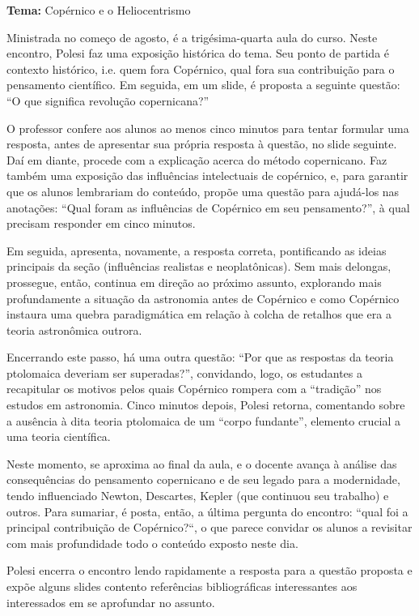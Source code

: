 \documentclass[12pt,a4paper]{article}
\begin{document}
	\textbf{Tema:} Copérnico e o Heliocentrismo

	Ministrada no começo de agosto, é a trigésima-quarta aula do curso. 
	Neste encontro, Polesi faz uma exposição histórica do tema. Seu 
	ponto de partida é contexto histórico, i.e. quem fora Copérnico, 
	qual fora sua contribuição para o pensamento científico. Em seguida, 
	em um slide, é proposta a seguinte questão: “O que significa revolução 
	copernicana?” 

	O professor confere aos alunos ao menos cinco minutos para tentar 
	formular uma resposta, antes de apresentar sua própria resposta à 
	questão, no slide seguinte. Daí em diante, procede com a explicação 
	acerca do método copernicano. Faz também uma exposição das influências 
	intelectuais de copérnico, e, para garantir que os alunos lembrariam 
	do conteúdo, propõe uma questão para ajudá-los nas anotações: “Qual 
	foram as influências de Copérnico em seu pensamento?”, à qual precisam 
	responder em cinco minutos. 

	Em seguida, apresenta, novamente, a resposta correta, pontificando as 
	ideias principais da seção (influências realistas e neoplatônicas). 
	Sem mais delongas, prossegue, então, continua em direção ao próximo 
	assunto, explorando mais profundamente a situação da astronomia 
	antes de Copérnico e como Copérnico instaura uma quebra paradigmática 
	em relação à colcha de retalhos que era a teoria astronômica outrora. 

	Encerrando este passo, há uma outra questão: “Por que as respostas da 
	teoria ptolomaica deveriam ser superadas?”, convidando, logo, os 
	estudantes a recapitular os motivos pelos quais Copérnico rompera com 
	a “tradição” nos estudos em astronomia. Cinco minutos depois, Polesi 
	retorna, comentando sobre a ausência à dita teoria ptolomaica de um 
	“corpo fundante”, elemento crucial a uma teoria científica. 

	Neste momento, se aproxima ao final da aula, e o docente avança à 
	análise das consequências do pensamento copernicano e de seu legado 
	para a modernidade, tendo influenciado Newton, Descartes, Kepler 
	(que continuou seu trabalho) e outros. Para sumariar, é posta, então, 
	a última pergunta do encontro: “qual foi a principal contribuição de 
	Copérnico?“, o que parece convidar os alunos a revisitar com mais 
	profundidade todo o conteúdo exposto neste dia. 

	Polesi encerra o encontro lendo rapidamente a resposta para a questão 
	proposta e expõe alguns slides contento referências bibliográficas 
	interessantes aos interessados em se aprofundar no assunto. 
\end{document}

